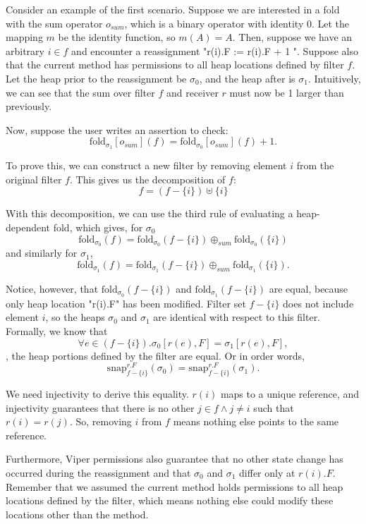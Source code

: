 \documentclass[msc,oneside]{ubcthesis}
\begin{document}
Consider an example of the first scenario. Suppose we are interested in a fold with the sum operator $o_{sum}$, which is a binary operator with identity 0. Let the mapping $m$ be the identity function, so $m(A) = A$. Then, suppose we have an arbitrary $i \in f$ and encounter a reassignment "r(i).F := r(i).F + 1 ". Suppose also that the current method has permissions to all heap locations defined by filter $f$.  Let the heap prior to the reassignment be $\sigma_0$, and the heap after is $\sigma_1$. Intuitively, we can see that the sum over filter $f$ and receiver $r$ must now be 1 larger than previously. 

Now, suppose the user writes an assertion to check:
$$ \textrm{fold}_{\sigma_1}[o_{sum}](f) = \textrm{fold}_{\sigma_0}[o_{sum}](f) + 1.$$

To prove this, we can construct a new filter by removing element $i$ from the original filter $f$. This gives us the decomposition of $f$:
$$f = \left( f - \{i\}\right) \uplus \{i\}$$

With this decomposition, we can use the third rule of evaluating a heap-dependent fold, which gives, for $\sigma_0$
$$\textrm{fold}_{\sigma_0}(f) = \textrm{fold}_{\sigma_0}(f - \{i\}) \oplus_{sum} \textrm{fold}_{\sigma_0}(\{i\})$$ and similarly for $\sigma_1$,
$$\textrm{fold}_{\sigma_1}(f) = \textrm{fold}_{\sigma_1}(f - \{i\}) \oplus_{sum} \textrm{fold}_{\sigma_1}(\{i\}).$$  

Notice, however, that $\textrm{fold}_{\sigma_0}(f - \{i\})$ and $\textrm{fold}_{\sigma_1}(f - \{i\})$ are equal, because only heap location "r(i).F" has been modified. Filter set $f - \{i\}$ does not include element $i$, so the heaps $\sigma_0$ and $\sigma_1$ are identical with respect to this filter. Formally, we know that 
$$\forall e \in \left(f - \{i\}\right). \sigma_0[r(e), F] =  \sigma_1[r(e), F],$$ \ie, the heap portions defined by the filter are equal. Or in order words, $$\textrm{snap}^{r.F}_{f - \{i\}}(\sigma_0) = \textrm{snap}^{r.F}_{f - \{i\}}(\sigma_1).$$

We need injectivity to derive this equality. $r(i)$ maps to a unique reference, and injectivity guarantees that there is no other $j \in f \land j \neq i$ such that $r(i) = r(j)$. So, removing $i$ from $f$ means nothing else points to the same reference.

Furthermore, Viper permissions also guarantee that no other state change has occurred during the reassignment and that $\sigma_0$ and $\sigma_1$ differ only at $r(i).F$. Remember that we assumed the current method holds permissions to all heap locations defined by the filter, which means nothing else could modify these locations other than the method. 
\end{document}
